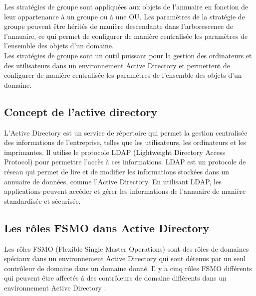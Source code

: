 \documentclass[12pt, a4paper]{article}
\begin{document}
Les stratégies de groupe sont appliquées aux objets de l'annuaire en fonction 
de leur appartenance à un groupe ou à une OU. Les paramètres de la stratégie de 
groupe peuvent être hérités de manière descendante dans l'arborescence de 
l'annuaire, ce qui permet de configurer de manière centralisée les paramètres de 
l'ensemble des objets d'un domaine.\\

Les stratégies de groupe sont un outil puissant pour la gestion des 
ordinateurs et des utilisateurs dans un environnement Active Directory et 
permettent de configurer de manière centralisée les paramètres de l'ensemble 
des objets d'un domaine.

\subsection{Concept de l'active directory}
L'Active Directory est un service de répertoire qui permet la gestion 
centralisée des informations de l'entreprise, telles que les utilisateurs, 
les ordinateurs et les imprimantes. Il utilise le protocole LDAP 
(Lightweight Directory Access Protocol) pour permettre l'accès à ces 
informations. LDAP est un protocole de réseau qui permet de lire et de 
modifier les informations stockées dans un annuaire de données, comme 
l'Active Directory. En utilisant LDAP, les applications peuvent accéder et 
gérer les informations de l'annuaire de manière standardisée et sécurisée.\\


\subsection{Les rôles FSMO dans Active Directory}
Les rôles FSMO (Flexible Single Master Operations) sont des rôles de domaines 
spéciaux dans un environnement Active Directory qui sont détenus par un seul 
contrôleur de domaine dans un domaine donné. Il y a cinq rôles FSMO différents 
qui peuvent être affectés à des contrôleurs de domaine différents dans un 
environnement Active Directory :\\
\end{document}
